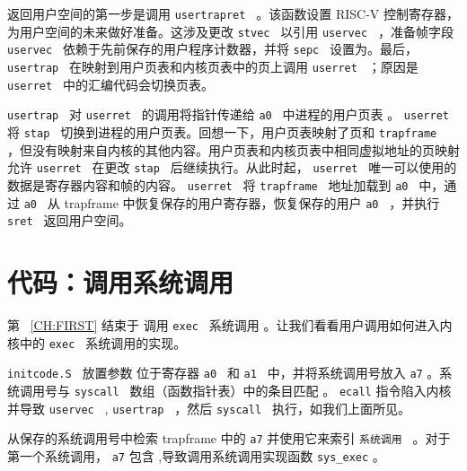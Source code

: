 返回用户空间的第一步是调用  {    \tt    usertrapret   } 
     。该函数设置 RISC-V 控制寄存器，为用户空间的未来做好准备。这涉及更改  {    \tt    stvec   }  以引用  {    \tt    uservec   }  ，准备帧字段
  {    \tt    uservec   }  依赖于先前保存的用户程序计数器，并将  {    \tt    sepc   }  设置为。最后， {    \tt    usertrap   }  在映射到用户页表和内核页表中的页上调用  {    \tt    userret   } ；原因是  {    \tt    userret   }  中的汇编代码会切换页表。  

 {    \tt    usertrap   }  对  {    \tt    userret   }  的调用将指针传递给  {    \tt    a0   }  中进程的用户页表
     。
  {    \tt    userret   }  将  {    \tt    stap   }  切换到进程的用户页表。回想一下，用户页表映射了页和  {    \tt    trapframe   }  ，但没有映射来自内核的其他内容。用户页表和内核页表中相同虚拟地址的页映射允许
  {    \tt    userret   }  在更改  {    \tt    stap   }  后继续执行。从此时起， {    \tt    userret   }  唯一可以使用的数据是寄存器内容和帧的内容。
  {    \tt    userret   }  将  {    \tt    trapframe   }  地址加载到  {    \tt    a0   }  中，通过  {    \tt    a0   }  从 trapframe 中恢复保存的用户寄存器，恢复保存的用户  {    \tt    a0   }  ，并执行  {    \tt    sret   }  返回用户空间。  

   \section{代码：调用系统调用  }     

第~    \ref{CH:FIRST}    结束于
        调用  {    \tt    exec   }  系统调用
       。让我们看看用户调用如何进入内核中的  {    \tt    exec   }  系统调用的实现。  

 {    \tt    initcode.S   }  放置参数
        位于寄存器  {    \tt    a0   }  和  {    \tt    a1   }  中，并将系统调用号放入
    \texttt{a7}    。系统调用号与  {    \tt    syscall   }  数组（函数指针表）中的条目匹配
        。    \lstinline{ecall}    指令陷入内核并导致
  {    \tt    uservec   }  ,
  {    \tt    usertrap   }  ，然后  {    \tt    syscall   }  执行，如我们上面所见。  

        从保存的系统调用号中检索
 trapframe 中的    \texttt{a7}    并使用它来索引  {    \tt    系统调用   }  。对于第一个系统调用，
    \texttt{a7}    包含
        ,导致调用系统调用实现函数
    \lstinline{sys_exec}    。  

